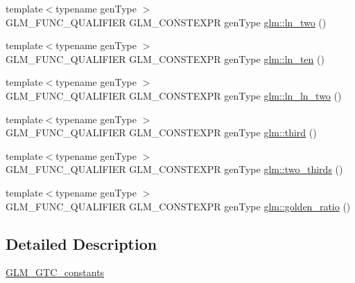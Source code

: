 \begin{DoxyCompactItemize}
\item 
{\footnotesize template$<$typename gen\+Type $>$ }\\G\+L\+M\+\_\+\+F\+U\+N\+C\+\_\+\+Q\+U\+A\+L\+I\+F\+I\+ER G\+L\+M\+\_\+\+C\+O\+N\+S\+T\+E\+X\+PR gen\+Type \hyperlink{group__gtc__constants_ga24f4d27765678116f41a2f336ab7975c}{glm\+::ln\+\_\+two} ()
\item 
{\footnotesize template$<$typename gen\+Type $>$ }\\G\+L\+M\+\_\+\+F\+U\+N\+C\+\_\+\+Q\+U\+A\+L\+I\+F\+I\+ER G\+L\+M\+\_\+\+C\+O\+N\+S\+T\+E\+X\+PR gen\+Type \hyperlink{group__gtc__constants_gaf97ebc6c059ffd788e6c4946f71ef66c}{glm\+::ln\+\_\+ten} ()
\item 
{\footnotesize template$<$typename gen\+Type $>$ }\\G\+L\+M\+\_\+\+F\+U\+N\+C\+\_\+\+Q\+U\+A\+L\+I\+F\+I\+ER G\+L\+M\+\_\+\+C\+O\+N\+S\+T\+E\+X\+PR gen\+Type \hyperlink{group__gtc__constants_gaca94292c839ed31a405ab7a81ae7e850}{glm\+::ln\+\_\+ln\+\_\+two} ()
\item 
{\footnotesize template$<$typename gen\+Type $>$ }\\G\+L\+M\+\_\+\+F\+U\+N\+C\+\_\+\+Q\+U\+A\+L\+I\+F\+I\+ER G\+L\+M\+\_\+\+C\+O\+N\+S\+T\+E\+X\+PR gen\+Type \hyperlink{group__gtc__constants_ga3077c6311010a214b69ddc8214ec13b5}{glm\+::third} ()
\item 
{\footnotesize template$<$typename gen\+Type $>$ }\\G\+L\+M\+\_\+\+F\+U\+N\+C\+\_\+\+Q\+U\+A\+L\+I\+F\+I\+ER G\+L\+M\+\_\+\+C\+O\+N\+S\+T\+E\+X\+PR gen\+Type \hyperlink{group__gtc__constants_ga9b4d2f4322edcf63a6737b92a29dd1f5}{glm\+::two\+\_\+thirds} ()
\item 
{\footnotesize template$<$typename gen\+Type $>$ }\\G\+L\+M\+\_\+\+F\+U\+N\+C\+\_\+\+Q\+U\+A\+L\+I\+F\+I\+ER G\+L\+M\+\_\+\+C\+O\+N\+S\+T\+E\+X\+PR gen\+Type \hyperlink{group__gtc__constants_ga748cf8642830657c5b7eae04d0a80899}{glm\+::golden\+\_\+ratio} ()
\end{DoxyCompactItemize}


\subsection{Detailed Description}
\hyperlink{group__gtc__constants}{G\+L\+M\+\_\+\+G\+T\+C\+\_\+constants} 